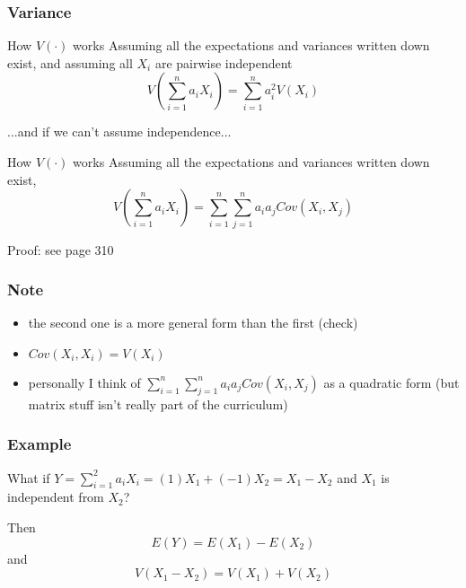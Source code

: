 \documentclass{beamer}
\begin{document}
\begin{frame}
\frametitle{Variance}

\begin{block}{How $V(\cdot)$ works}
Assuming all the expectations and variances written down exist, and assuming all $X_i$ are pairwise independent
\[
V\left( \sum_{i=1}^n a_i X_i \right) = \sum_{i=1}^n a_i^2 V(X_i)
\]
\end{block}

...and if we can't assume independence...

\begin{block}{How $V(\cdot)$ works}
Assuming all the expectations and variances written down exist,
\[
V\left( \sum_{i=1}^n a_i X_i \right) = \sum_{i=1}^n \sum_{j=1}^n a_i a_j Cov(X_i, X_j)
\]
\end{block}

Proof: see page 310 


\end{frame}




\begin{frame}
\frametitle{Note}

\begin{itemize}
\item the second one is a more general form than the first (check)
\item $Cov(X_i, X_i) = V(X_i)$
\item personally I think of $\sum_{i=1}^n \sum_{j=1}^n a_i a_j Cov(X_i, X_j)$ as a quadratic form (but matrix stuff isn't really part of the curriculum)
\end{itemize}

\end{frame}



\begin{frame}
\frametitle{Example}

What if $Y = \sum_{i=1}^2 a_i X_i = (1)X_1 + (-1)X_2 = X_1 - X_2$ and $X_1$ is independent from $X_2$?
\newline

Then
\[
E(Y) = E(X_1) - E(X_2)
\]
and
\[
V(X_1 - X_2) = V(X_1) + V(X_2)
\]


\end{frame}
\end{document}
